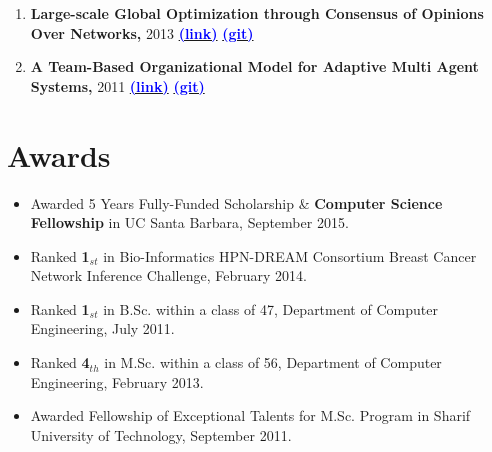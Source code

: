 \documentclass[letter]{res}
\begin{document}
\begin{resume}
\begin{enumerate}[leftmargin=-.01in]
\item \textbf{Large-scale Global Optimization through Consensus of Opinions Over Networks,} 2013 {\href{http://www.casmodeling.com/content/1/1/11}{\textbf{\textcolor{blue}{(link)}}}}
{\href{https://github.com/omid55/optimization_opinion_formation}{\textbf{\textcolor{blue}{(git)}}}}


\item \textbf{A Team-Based Organizational Model for Adaptive Multi Agent Systems,} 2011
{\href{https://www.researchgate.net/publication/221539731_A_Team-based_Organizational_Model_for_Adaptive_Multi-agent_Systems}{\textbf{\textcolor{blue}{(link)}}}}
{\href{https://github.com/omid55/team_based_rescue_jade_multi_agent_system}{\textbf{\textcolor{blue}{(git)}}}}

\end{enumerate}


\section{Awards}
 \begin{itemize}[leftmargin=-.01in]
 \item Awarded 5 Years Fully-Funded Scholarship \& \textbf{Computer Science Fellowship} in UC Santa Barbara, September 2015.
 \item Ranked \textbf{1}$_{st}$ in Bio-Informatics HPN-DREAM Consortium Breast Cancer Network Inference Challenge, February 2014.
 \item Ranked \textbf{1}$_{st}$ in B.Sc. within a class of 47, Department of Computer Engineering, July 2011.
 \item Ranked \textbf{4}$_{th}$ in M.Sc. within a class of 56, Department of Computer Engineering, February 2013.
 \item Awarded Fellowship of Exceptional Talents for M.Sc. Program in Sharif University of Technology, September 2011.
\end{itemize}



\end{resume}
\end{document}
